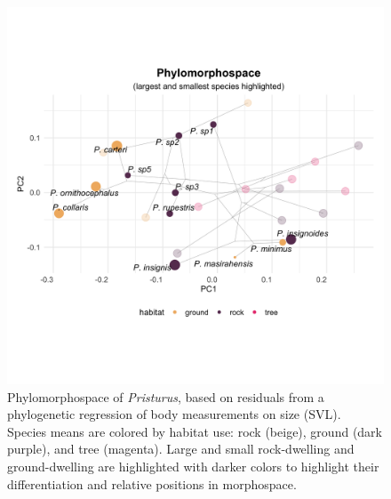 \documentclass[
]{article}
\begin{document}
\newpage

\begin{figure}
\includegraphics[width=1\linewidth]{Figs/phylomorphospace_large_small} \caption{Phylomorphospace of \textit{Pristurus}, based on residuals from a phylogenetic regression of body measurements on size (SVL). Species means are colored by habitat use: rock (beige), ground (dark purple), and tree (magenta). Large and small rock-dwelling and ground-dwelling are highlighted with darker colors to highlight their differentiation and relative positions in morphospace.}\label{fig:unnamed-chunk-4}
\end{figure}
\end{document}
